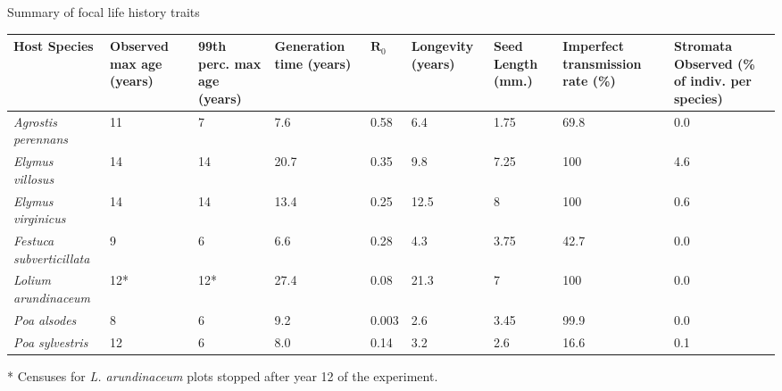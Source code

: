 \documentclass[12pt]{article}
\begin{document}
 Summary of focal life history traits \\
\begin{table}[ht]
\begin{adjustbox}{width=1\textwidth}{
\begin{tabular}{|p{4cm}| p{2cm} |p{2cm}|p{2cm}| p{1cm}|p{2cm}|p{2cm}|p{2.5cm}| p{2cm}|}
	\hline
	\bf{Host Species} & \bf{Observed max age (years)}& \bf{99th perc. max age (years)}&\bf{Generation time (years)} & $\mathbf{R}_0$ &\bf{Longevity (years)}&\bf{Seed Length (mm.)}&\bf{Imperfect transmission rate (\%)} & \bf{Stromata Observed (\% of indiv. per species)}\\
	\hline
	\emph{Agrostis perennans} &11&7&7.6&0.58&6.4&1.75&69.8&0.0\\
	\emph{Elymus villosus} &14&14&20.7&0.35&9.8&7.25&100&4.6\\
	\emph{Elymus virginicus} &14&14&13.4&0.25&12.5&8&100&0.6\\
	\emph{Festuca subverticillata} &9&6&6.6&0.28&4.3&3.75&42.7&0.0\\
	\emph{Lolium arundinaceum} &12*&12*&27.4&0.08&21.3&7&100&0.0\\
	\emph{Poa alsodes} &8&6&9.2&0.003&2.6&3.45&99.9&0.0\\
	\emph{Poa sylvestris}&12&6&8.0&0.14&3.2&2.6&16.6&0.1\\
	 \hline
\end{tabular}}
\end{adjustbox}
\end{table}

* Censuses for \emph{L. arundinaceum} plots stopped after year 12 of the experiment.
\end{document}
